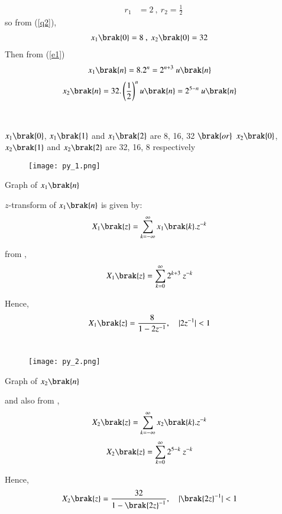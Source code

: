 \documentclass[beamer]{IEEEtran}
\theoremstyle{remark}
\begin{document}
\begin{align}
\label{q3}
r_1&=2\ ,\ r_2=\frac{1}{2}
\end{align}
so from (\ref{q2}),
\begin{align}x_1\brak{0}&=8\ ,\ x_2\brak{0}=32\end{align}
Then from (\ref{e1})
\begin{align}
    \label{a11}
    x_{1}\brak{n}&=8.2^{n}=2^{n+3}\ u\brak{n}
\end{align}
\begin{align}
    \label{a12}
    x_{2}\brak{n}=32.\left(\frac{1}{2}\right)^{n}u\brak{n}&=2^{5-n}\ u\brak{n}
\end{align}\\\\
$x_1\brak{0}$, $x_1\brak{1}$ and $x_1\brak{2}$ are 8, 16, 32 $\brak{or}$ $x_2\brak{0}$, $x_2\brak{1}$ and $x_2\brak{2}$ are 32, 16, 8 respectively
\begin{figure}[h]
    \centering
    \texttt{[image: py\_1.png]}
    \label{$2^{n+3}$}
\end{figure}

\begin{center}
    Graph of $x_1\brak{n}$
\end{center}
$z$-transform of $x_1\brak{n}$ is given by:\\
\begin{align}
\label{a13}
    X_1\brak{z}&=\sum_{k=-\infty}^{\infty} x_1\brak{k}.z^{-k}
\end{align}

from \brak{\ref{a11}},\\
\begin{align}X_1\brak{z}&=\sum_{k=0}^{\infty}2^{k+3}\ z^{-k}\end{align}

Hence,\\
\begin{align}
X_1\brak{z}&=\frac{8}{1-2z^{-1}},\quad |2z^{-1}|<1
\end{align}\\[10ex]

\begin{figure}[h]
    \centering
    \texttt{[image: py\_2.png]}
    \label{$2^{5-n}$}
\end{figure}

\begin{center}
    Graph of $x_2\brak{n}$
\end{center}

and also from \brak{\ref{a12}},\\
\begin{align}
    X_2\brak{z}&=\sum_{k=-\infty}^{\infty} x_2\brak{k}.z^{-k}
\end{align}
\begin{align}X_2\brak{z}&=\sum_{k=0}^{\infty} 2^{5-k}\ z^{-k}\end{align}

Hence,
\begin{align}X_2\brak{z}&=\frac{32}{1-{\brak{2z}^{-1}}},\quad |{\brak{2z}^{-1}}|<1 \end{align}
\end{document}
